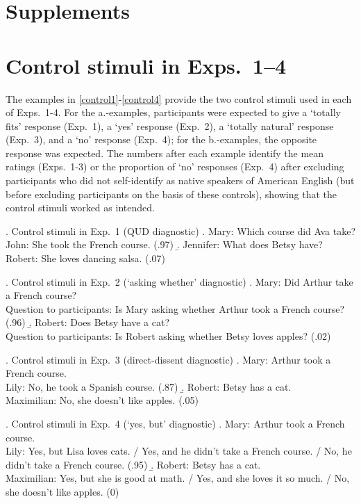 \documentclass[times,linguex]{glossa}
\begin{document}
\setcounter{ExNo}{0}
\renewcommand*{\theHExNo}{appendix.\arabic{ExNo}}

\section*{Supplements}

\section{Control stimuli in Exps.~1--4}\label{supp:stims}

The examples in \ref{control1}-\ref{control4} provide the two control stimuli used in each of Exps.~1-4. For the a.-examples, participants were expected to give a `totally fits' response (Exp.~1), a `yes' response (Exp.~2), a `totally natural' response (Exp.~3), and a `no' response (Exp.~4); for the b.-examples, the opposite response was expected. The numbers after each example identify the mean ratings (Exps.~1-3) or the proportion of `no' responses (Exp.~4) after excluding participants who did not self-identify as native speakers of American English (but before excluding participants on the basis of these controls), showing that the control stimuli worked as intended.

\ex.\label{control1} Control stimuli in Exp.~1 (QUD diagnostic)
\a. Mary: Which course did Ava take?
\\ John: She took the French course. (.97)
\b. Jennifer: What does Betsy have?
\\ Robert: She loves dancing salsa. (.07)

\ex.\label{control2} Control stimuli in Exp.~2 (`asking whether' diagnostic)
\a. Mary: Did Arthur take a French course?
\\ Question to participants: Is Mary asking whether Arthur took a French course? (.96)
\b. Robert: Does Betsy have a cat?
\\ Question to participants: Is Robert asking whether Betsy loves apples? (.02)

\ex.\label{control3} Control stimuli in Exp.~3 (direct-dissent diagnostic)
\a. Mary: Arthur took a French course.
\\ Lily: No, he took a Spanish course. (.87)
\b. Robert: Betsy has a cat.
\\ Maximilian: No, she doesn't like apples. (.05)

\ex.\label{control4} Control stimuli in Exp.~4 (`yes, but' diagnostic)
\a. Mary: Arthur took a French course.
\\ Lily: Yes, but Lisa loves cats. / Yes, and he didn't take a French course. / No, he didn't take a French course. (.95)
\b. Robert: Betsy has a cat.
\\ Maximilian: Yes, but she is good at math. / Yes, and she loves it so much. / No, she doesn't like apples. (0)
\end{document}
